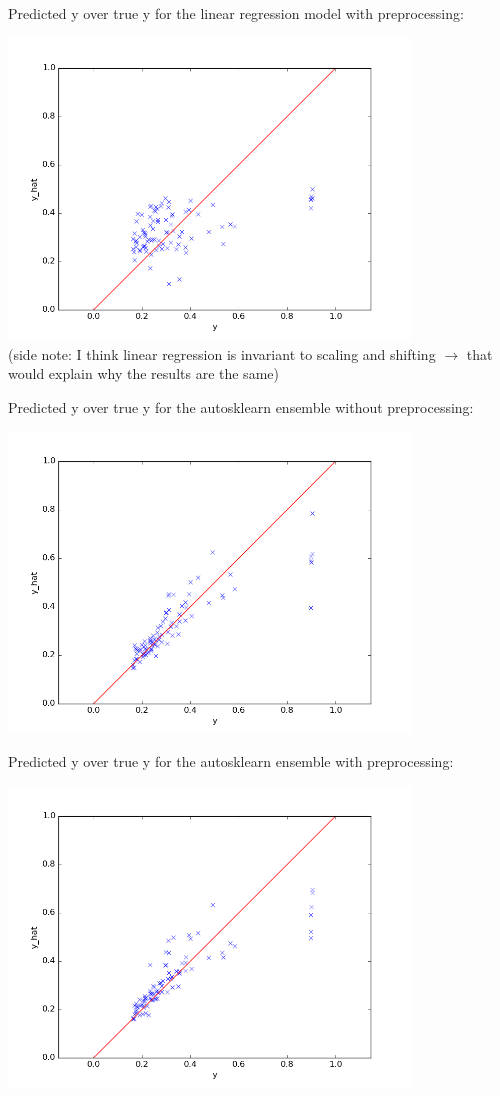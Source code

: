 \documentclass[a4paper,10pt]{article}
\begin{document}
Predicted y over true y for the linear regression model with preprocessing:

\includegraphics[width=0.8\textwidth]{../../figures/baseline_LinearRegression_standardized_predictions} \\
(side note: I think linear regression is invariant to scaling and shifting $\rightarrow$ that would explain why the results are the same)

\vspace{0.5cm}
Predicted y over true y for the autosklearn ensemble without preprocessing:

\includegraphics[width=0.8\textwidth]{../../figures/baseline_autosklearn_60s_predictions}

Predicted y over true y for the autosklearn ensemble with preprocessing:

\includegraphics[width=0.8\textwidth]{../../figures/baseline_autosklearn_60s_standardized_predictions}
\end{document}
